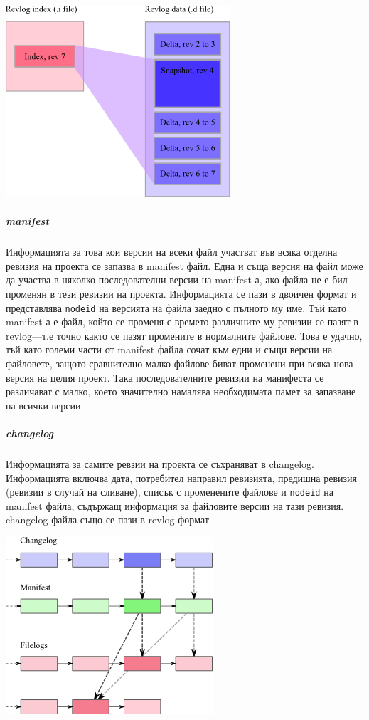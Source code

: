 \documentclass[a4paper]{article}
\begin{document}
    \includegraphics[scale=0.7]{hg_revlog}

    \subparagraph{manifest} Информацията за това кои версии на всеки файл
    участват във всяка отделна ревизия на проекта се запазва в manifest файл.
    Една и съща версия на файл може да участва в няколко последователни версии
    на manifest-а, ако файла не е бил променян в тези ревизии на проекта.
    Информацията се пази в двоичен формат и представлява \texttt{nodeid} на
    версията на файла заедно с пълното му име. Тъй като manifest-а е файл,
    който се променя с времето различните му ревизии се пазят в revlog---т.е
    точно както се пазят промените в нормалните файлове. Това е удачно, тъй
    като големи части от manifest файла сочат към едни и същи версии на
    файловете, защото сравнително малко файлове биват променени при всяка нова
    версия на целия проект. Така последователните ревизии на манифеста се
    различават с малко, което значително намалява необходимата памет за
    запазване на всички версии.

    \subparagraph{changelog}
    Информацията за самите ревзии на проекта се съхраняват в changelog.
    Информацията включва дата, потребител направил ревизията, предишна
    ревизия (ревизии в случай на сливане), списък с променените файлове
    и \texttt{nodeid} на manifest файла, съдържащ информация за файловите
    версии на тази ревизия. changelog файла също се пази в revlog формат.

    \vspace{10 mm}

    \includegraphics[scale=1.0]{hg_basics}
\end{document}

